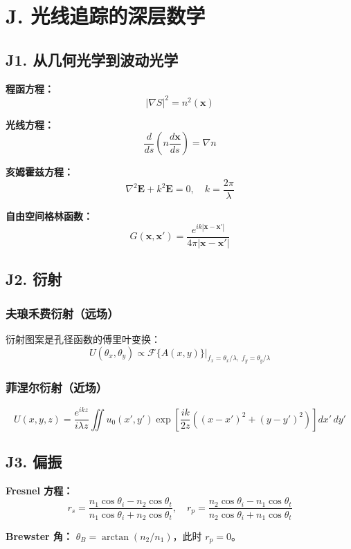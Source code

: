 \section{J. 光线追踪的深层数学}

\subsection{J1. 从几何光学到波动光学}

\textbf{程函方程：}
\[
|\nabla S|^2 = n^2(\mathbf{x})
\]

\textbf{光线方程：}
\[
\frac{d}{ds}\left(n\frac{d\mathbf{x}}{ds}\right) = \nabla n
\]

\textbf{亥姆霍兹方程：}
\[
\nabla^2 \mathbf{E} + k^2 \mathbf{E} = 0, \quad k = \frac{2\pi}{\lambda}
\]

\textbf{自由空间格林函数：}
\[
G(\mathbf{x}, \mathbf{x}') = \frac{e^{ik|\mathbf{x}-\mathbf{x}'|}}{4\pi|\mathbf{x}-\mathbf{x}'|}
\]

\subsection{J2. 衍射}

\subsubsection{夫琅禾费衍射（远场）}

衍射图案是孔径函数的傅里叶变换：
\[
U(\theta_x, \theta_y) \propto \mathcal{F}\{A(x,y)\}\bigg|_{f_x = \theta_x/\lambda,\; f_y = \theta_y/\lambda}
\]

\subsubsection{菲涅尔衍射（近场）}

\[
U(x,y,z) = \frac{e^{ikz}}{i\lambda z}\iint u_0(x',y') \exp\left[\frac{ik}{2z}((x-x')^2 + (y-y')^2)\right]dx'\,dy'
\]

\subsection{J3. 偏振}

\textbf{Fresnel 方程：}
\[
r_s = \frac{n_1\cos\theta_i - n_2\cos\theta_t}{n_1\cos\theta_i + n_2\cos\theta_t}, \quad
r_p = \frac{n_2\cos\theta_i - n_1\cos\theta_t}{n_2\cos\theta_i + n_1\cos\theta_t}
\]

\textbf{Brewster 角：} $\theta_B = \arctan(n_2/n_1)$，此时 $r_p = 0$。

